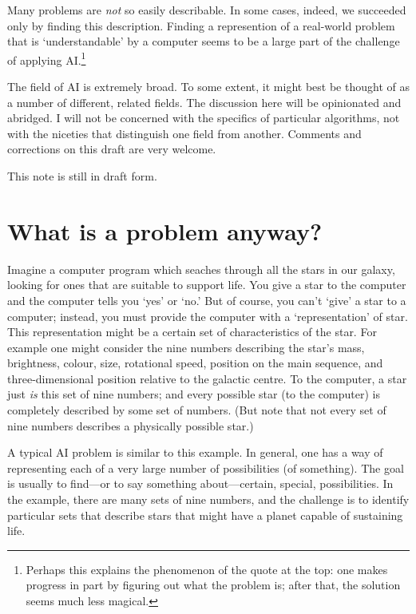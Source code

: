 \documentclass[10pt, a4, twocolumn]{article}
\begin{document}
Many problems are \emph{not} so easily describable. In some cases, indeed, we
succeeded only by finding this description. Finding a represention of a
real-world problem that is `understandable' by a computer seems to be a large
part of the challenge of applying AI.\footnote{Perhaps this explains the
phenomenon of the quote at the top: one makes progress in part by figuring out
what the problem is; after that, the solution seems much less magical.}

The field of AI is extremely broad. To some extent, it might best be thought of
as a number of different, related fields. The discussion here will be
opinionated and abridged. I will not be concerned with the specifics of
particular algorithms, not with the niceties that distinguish one field from
another. Comments and corrections on this draft are very welcome.

This note is still in draft form. 

\section{What is a problem anyway?}

Imagine a computer program which seaches through all the stars in our galaxy,
looking for ones that are suitable to support life. You give a star to the
computer and the computer tells you `yes' or `no.' But of course, you can't
`give' a star to a computer; instead, you must provide the computer with a
`representation' of star. This representation might be a certain set of
characteristics of the star. For example one might consider the nine numbers
describing the star's mass, brightness, colour, size, rotational speed, position
on the main sequence, and three-dimensional position relative to the galactic
centre. To the computer, a star just \emph{is} this set of nine numbers; and
every possible star (to the computer) is completely described by some set of
numbers. (But note that not every set of nine numbers describes a physically
possible star.)

A typical AI problem is similar to this example. In general, one has a way of
representing each of a very large number of possibilities (of something). The
goal is usually to find---or to say something about---certain, special,
possibilities. In the example, there are many sets of nine numbers, and the
challenge is to identify particular sets that describe stars that might have a
planet capable of sustaining life.
\end{document}

